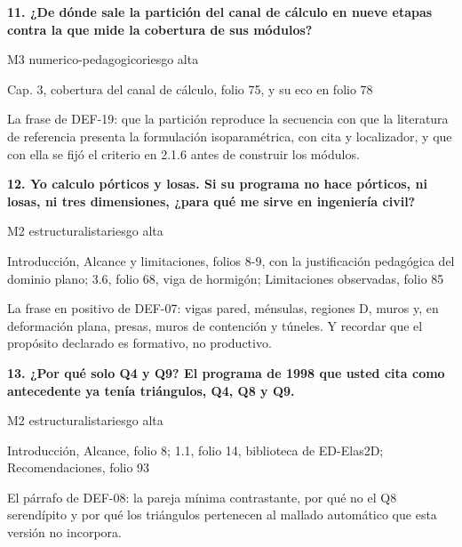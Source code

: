 \vspace{5pt}
\noindent\casilla\textbf{11. ¿De dónde sale la partición del canal de cálculo en nueve etapas contra la que mide la cobertura de sus módulos?}\par
{\small\color{gris}\sffamily M3 numerico-pedagogico\quad{}\quad riesgo alta}\par
{\small{}Cap. 3, cobertura del canal de cálculo, folio 75, y su eco en folio 78\par}
{\small{}La frase de DEF-19: que la partición reproduce la secuencia con que la literatura de referencia presenta la formulación isoparamétrica, con cita y localizador, y que con ella se fijó el criterio en 2.1.6 antes de construir los módulos.\par}
\vspace{5pt}
\noindent\casilla\textbf{12. Yo calculo pórticos y losas. Si su programa no hace pórticos, ni losas, ni tres dimensiones, ¿para qué me sirve en ingeniería civil?}\par
{\small\color{gris}\sffamily M2 estructuralista\quad{}\quad riesgo alta}\par
{\small{}Introducción, Alcance y limitaciones, folios 8-9, con la justificación pedagógica del dominio plano; 3.6, folio 68, viga de hormigón; Limitaciones observadas, folio 85\par}
{\small{}La frase en positivo de DEF-07: vigas pared, ménsulas, regiones D, muros y, en deformación plana, presas, muros de contención y túneles. Y recordar que el propósito declarado es formativo, no productivo.\par}
\vspace{5pt}
\noindent\casilla\textbf{13. ¿Por qué solo Q4 y Q9? El programa de 1998 que usted cita como antecedente ya tenía triángulos, Q4, Q8 y Q9.}\par
{\small\color{gris}\sffamily M2 estructuralista\quad{}\quad riesgo alta}\par
{\small{}Introducción, Alcance, folio 8; 1.1, folio 14, biblioteca de ED-Elas2D; Recomendaciones, folio 93\par}
{\small{}El párrafo de DEF-08: la pareja mínima contrastante, por qué no el Q8 serendípito y por qué los triángulos pertenecen al mallado automático que esta versión no incorpora.\par}

